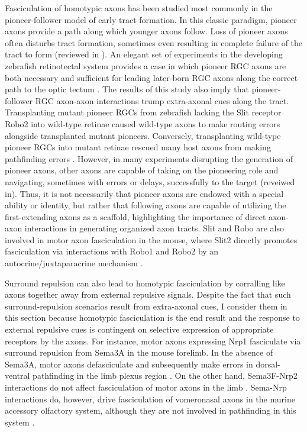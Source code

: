 \label{sec:HomotypicFascic}
Fasciculation of homotypic axons has been studied most commonly in the pioneer-follower model of early tract formation.
In this classic paradigm, pioneer axons provide a path along which younger axons follow.
Loss of pioneer axons often disturbs tract formation, sometimes even resulting in complete failure of the tract to form (reviewed in ).
An elegant set of experiments in the developing zebrafish retinotectal system provides a case in which pioneer RGC axons are both necessary and sufficient for leading later-born RGC axons along the correct path to the optic tectum \cite{pittman2008pathfinding}.
The results of this study also imply that pioneer-follower RGC axon-axon interactions trump extra-axonal cues along the tract.
Transplanting mutant pioneer RGCs from zebrafish lacking the Slit receptor Robo2 into wild-type retinae caused wild-type axons to make routing errors alongside transplanted mutant pioneers.
Conversely, transplanting wild-type pioneer RGCs into mutant retinae rescued many host axons from making pathfinding errors \cite{pittman2008pathfinding}.
However, in many experiments disrupting the generation of pioneer axons, other axons are capable of taking on the pioneering role and navigating, sometimes with errors or delays, successfully to the target (reveiwed in).
Thus, it is not necessarily that pioneer axons are endowed with a special ability or identity, but rather that following axons are capable of utilizing the first-extending axons as a scaffold, highlighting the importance of direct axon-axon interactions in generating organized axon tracts.
Slit and Robo are also involved in motor axon fasciculation in the mouse, where Slit2 directly promotes fasciculation via interactions with Robo1 and Robo2 by an autocrine/juxtaparacrine mechanism \cite{jaworski2012autocrine}.

Surround repulsion can also lead to homotypic fasciculation by corralling like axons together away from external repulsive signals.
Despite the fact that such surround-repulsion scenarios result from extra-axonal cues, I consider them in this section because homotypic fasciculation is the end result and the response to external repulsive cues is contingent on selective expression of appropriate receptors by the axons.
For instance, motor axons expressing Nrp1 fasciculate via surround repulsion from Sema3A in the mouse forelimb.
In the absence of Sema3A, motor axons defasciculate and subsequently make errors in dorsal-ventral pathfinding in the limb plexus region \cite{huber2005distinct}.
On the other hand, Sema3F-Nrp2 interactions do not affect fasciculation of motor axons in the limb \cite{huber2005distinct}.
Sema-Nrp interactions do, however, drive fasciculation of vomeronasal axons in the murine accessory olfactory system, although they are not involved in pathfinding in this system \cite{cloutier2002neuropilin}.

